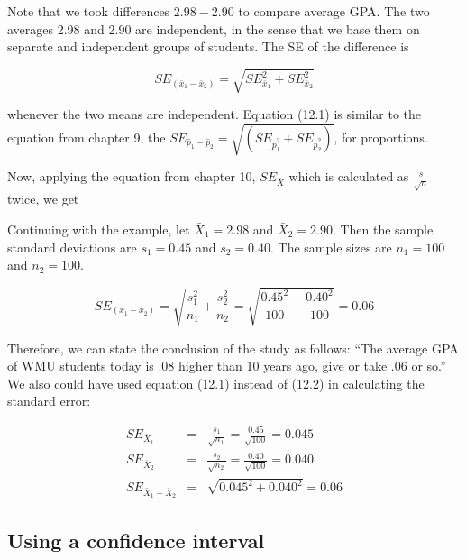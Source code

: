 \documentclass[11pt, chapterprefix=true]{scrbook}\usepackage[]{graphicx}\usepackage[]{color}
\begin{document}
Note that we took differences $2.98 - $2.90 to compare average GPA.  The two averages 2.98 and 2.90 are independent, in the sense that we base them on separate and independent groups of students.  The SE of the difference is

\begin{equation}
SE_{(\bar{x}_1 - \bar{x}_2)} = \sqrt{SE_{\bar{x}_1}^2 + SE_{\bar{x}_2}^2 }
\end{equation}

whenever the two means are independent.  Equation (12.1) is similar to the equation from chapter 9, the $SE_{\hat{p}_1 - \hat{p}_2} = \sqrt{(SE_{\hat{p}_1^2} + SE_{\hat{p}_2^2 })}$, for proportions. 

Now, applying the equation from chapter 10, $SE_{\bar{X}}$ which is calculated as $\frac{s}{\sqrt{n}}$ twice, we get


Continuing with the example, let $\bar{X}_1  = 2.98$ and $\bar{X}_2  = 2.90$.  Then the sample standard deviations are $s_1 = 0.45$ and $s_2 = 0.40$.   The sample sizes are $n_1 = 100$ and $n_2 = 100$.

\begin{equation*}
SE_{(\bar{x}_1 - \bar{x}_2)} = \sqrt{\frac{s_1^2}{n_1}  + \frac{s_2^2}{n_2} } = \sqrt{\frac{0.45^2}{100}  + \frac{0.40^2}{100} } = 0.06
\end{equation*}

Therefore, we can state the conclusion of the study as follows: ``The average GPA of WMU students today is .08 higher than 10 years ago, give or take .06 or so.'' We also could have used equation (12.1) instead of (12.2) in calculating the standard error:

\begin{eqnarray*}
SE_{\bar{X}_1} &=& \frac{s_1}{\sqrt{n_1}} = \frac{0.45}{\sqrt{100}} = 0.045 \\
SE_{\bar{X}_2} &=& \frac{s_2}{\sqrt{n_2}} = \frac{0.40}{\sqrt{100}} = 0.040 \\
SE_{\bar{X}_1 - \bar{X}_2} &=& \sqrt{0.045^2 + 0.040^2} = 0.06 
\end{eqnarray*}

\subsection{Using a confidence interval}
\end{document}
